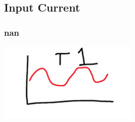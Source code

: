\newpage
\subsection{Input Current}

\subsubsection{nan}

\begin{center}

\end{center}

\begin{center}
\includegraphics[width=0.5\textwidth]{tests/input/input_current/images/image1.png}
\end{center}



